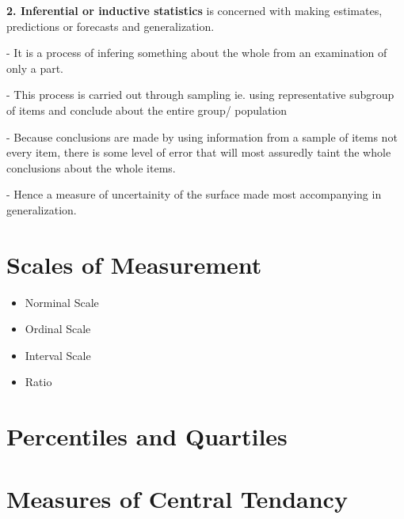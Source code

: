 \documentclass[11pt,a4paper]{article}
\begin{document}
\textbf{2. Inferential or inductive statistics} is concerned with making estimates, predictions or forecasts and generalization.

- It is  a process of infering something about the whole from an examination of only a part.

- This process is carried out through sampling ie. using representative subgroup of items and conclude about the entire group/ population

- Because conclusions are made by using information from a sample of items not every item, there is some level of error that will most assuredly taint the whole conclusions about the whole items.

- Hence a measure of uncertainity of the surface made most accompanying in generalization.

\section{Scales of Measurement}
\begin{itemize}
    \item Norminal Scale
    \item Ordinal Scale
    \item Interval Scale
    \item Ratio
\end{itemize}

\section{Percentiles and Quartiles}
\section{Measures of Central Tendancy}
\end{document}
